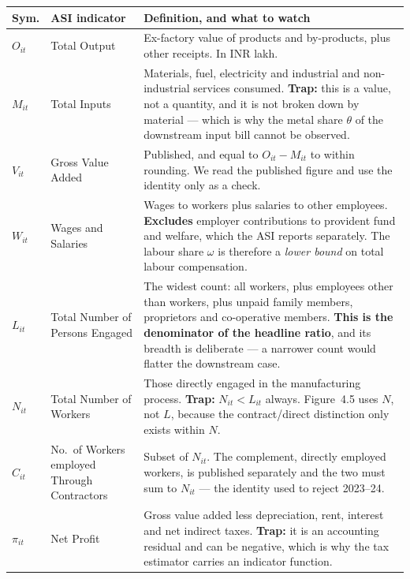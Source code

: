 \documentclass[11pt, a4paper]{article}
\begin{document}
\begin{table}[H]
\centering\small
\begin{tabular}{p{1.1cm}p{4.0cm}p{9.6cm}}
\toprule
\textbf{Sym.} & \textbf{ASI indicator} & \textbf{Definition, and what to watch} \\
\midrule
$O_{it}$ & Total Output & Ex-factory value of products and by-products, plus other
receipts. In INR lakh. \\
\addlinespace
$M_{it}$ & Total Inputs & Materials, fuel, electricity and industrial and
non-industrial services consumed. \textbf{Trap:} this is a value, not a quantity, and
it is not broken down by material --- which is why the metal share $\theta$ of the
downstream input bill cannot be observed. \\
\addlinespace
$V_{it}$ & Gross Value Added & Published, and equal to $O_{it} - M_{it}$ to within
rounding. We read the published figure and use the identity only as a check. \\
\addlinespace
$W_{it}$ & Wages and Salaries & Wages to workers plus salaries to other employees.
\textbf{Excludes} employer contributions to provident fund and welfare, which the ASI
reports separately. The labour share $\omega$ is therefore a \emph{lower bound} on
total labour compensation. \\
\addlinespace
$L_{it}$ & Total Number of Persons Engaged & The widest count: all workers, plus
employees other than workers, plus unpaid family members, proprietors and
co-operative members. \textbf{This is the denominator of the headline ratio}, and its
breadth is deliberate --- a narrower count would flatter the downstream case. \\
\addlinespace
$N_{it}$ & Total Number of Workers & Those directly engaged in the manufacturing
process. \textbf{Trap:} $N_{it} < L_{it}$ always. Figure~4.5 uses $N$, not $L$,
because the contract/direct distinction only exists within $N$. \\
\addlinespace
$C_{it}$ & No.\ of Workers employed Through Contractors & Subset of $N_{it}$. The
complement, directly employed workers, is published separately and the two must sum
to $N_{it}$ --- the identity used to reject 2023--24. \\
\addlinespace
$\pi_{it}$ & Net Profit & Gross value added less depreciation, rent, interest and
net indirect taxes. \textbf{Trap:} it is an accounting residual and can be negative,
which is why the tax estimator carries an indicator function. \\
\bottomrule
\end{tabular}
\end{table}
\end{document}
